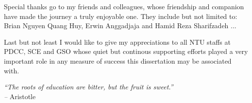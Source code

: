 Special thanks go to my friends and colleagues, whose friendship and companion have made the journey a truly enjoyable one. 
They include but not limited to: Brian Nguyen Quang Huy, Erwin Anggadjaja and Hamid Reza Sharifzadeh ...

Last but not least I would like to give my appreciations to all NTU staffs at PDCC, SCE and GSO whose quiet but continous supporting efforts played a very important role in any measure of success this dissertation may be associated with.

\begin{flushright}
	\parbox[t]{1\textwidth}{%
	\begin{flushright}
		\emph{{}``The roots of education are bitter, but the fruit is sweet.''}\\
		\emph{--} Aristotle\\
	\par\end{flushright}%
	}	
\par\end{flushright}




